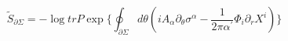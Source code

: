 \begin{equation}
\tilde S_{\partial\Sigma}=-\log trP\exp\bigl\lbrace
\oint_{\partial\Sigma}d\theta(iA_\alpha\partial_\theta
\sigma^\alpha-\frac{1}{2\pi\alpha^\prime}\Phi_i\partial_r
X^i)\bigr\rbrace
\end{equation}

